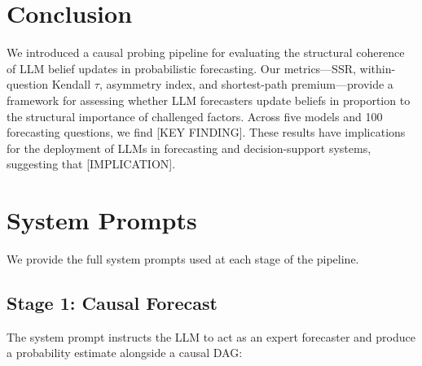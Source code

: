 \documentclass[11pt]{article}
\begin{document}
\section{Conclusion}
\label{sec:conclusion}


We introduced a causal probing pipeline for evaluating the structural coherence of LLM belief updates in probabilistic forecasting. Our metrics---SSR, within-question Kendall $\tau$, asymmetry index, and shortest-path premium---provide a framework for assessing whether LLM forecasters update beliefs in proportion to the structural importance of challenged factors. Across five models and 100 forecasting questions, we find [KEY FINDING]. These results have implications for the deployment of LLMs in forecasting and decision-support systems, suggesting that [IMPLICATION].




\appendix

\section{System Prompts}
\label{app:prompts}

We provide the full system prompts used at each stage of the pipeline.

\subsection{Stage 1: Causal Forecast}
\label{app:prompt-forecast}

The system prompt instructs the LLM to act as an expert forecaster and produce a probability estimate alongside a causal DAG:
\end{document}
